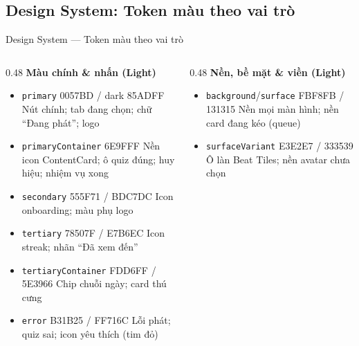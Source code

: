 \subsection{Design System: Token màu theo vai trò}
\begin{frame}{Design System --- Token màu theo vai trò}
\begin{columns}[T]
\begin{column}{0.48\textwidth}
{\small\textbf{Màu chính \& nhấn (Light)}}\vspace{1mm}
{\tiny
\begin{itemize}\setlength{\itemsep}{3pt}
\item {} \texttt{primary} 0057BD / dark 85ADFF \newline Nút chính; tab đang chọn; chữ ``Đang phát''; logo
\item {} \texttt{primaryContainer} 6E9FFF \newline Nền icon ContentCard; ô quiz đúng; huy hiệu; nhiệm vụ xong
\item {} \texttt{secondary} 555F71 / BDC7DC \newline Icon onboarding; màu phụ logo
\item {} \texttt{tertiary} 78507F / E7B6EC \newline Icon streak; nhãn ``Đã xem đến''
\item {} \texttt{tertiaryContainer} FDD6FF / 5E3966 \newline Chip chuỗi ngày; card thú cưng
\item {} \texttt{error} B31B25 / FF716C \newline Lỗi phát; quiz sai; icon yêu thích (tim đỏ)
\end{itemize}}
\end{column}
\begin{column}{0.48\textwidth}
{\small\textbf{Nền, bề mặt \& viền (Light)}}\vspace{1mm}
{\tiny
\begin{itemize}\setlength{\itemsep}{3pt}
\item {} \texttt{background}/\texttt{surface} FBF8FB / 131315 \newline Nền mọi màn hình; nền card đang kéo (queue)
\item {} \texttt{surfaceVariant} E3E2E7 / 333539 \newline Ô làn Beat Tiles; nền avatar chưa chọn

\end{itemize}}
\end{column}
\end{columns}
\end{frame}
